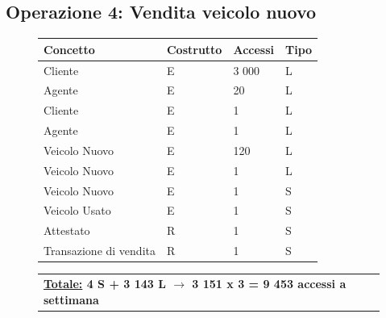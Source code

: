 \documentclass[a4paper,12pt]{report}
\begin{document}
\subsection*{Operazione 4: Vendita veicolo nuovo}
\begin{figure}[H]
	\centering
	\begin{tabular}{L{4.2cm}C{2cm}C{4.5cm}C{2cm}}
		\rule[-2mm]{0mm}{0.6cm}{}
		\textbf{Concetto} & \textbf{Costrutto} &\textbf{Accessi} & \textbf{Tipo} \\
		\hline\rule[-2mm]{0mm}{0.65cm}{}
		Cliente & E & 3 000 & L \\
		\hline\rule[-2mm]{0mm}{0.65cm}{}
		Agente & E & 20 & L \\
		\hline\rule[-2mm]{0mm}{0.65cm}{}
		Cliente & E & 1 & L \\
		\hline\rule[-2mm]{0mm}{0.65cm}{}
		Agente & E & 1 & L \\
		\hline\rule[-2mm]{0mm}{0.65cm}{}
		Veicolo Nuovo & E & 120 & L \\
		\hline\rule[-2mm]{0mm}{0.65cm}{}
		Veicolo Nuovo & E & 1 & L \\
		\hline\rule[-2mm]{0mm}{0.65cm}{}
		Veicolo Nuovo & E & 1 & S \\
		\hline\rule[-2mm]{0mm}{0.65cm}{}
		Veicolo Usato & E & 1 & S \\
		\hline\rule[-2mm]{0mm}{0.65cm}{}
		Attestato & R & 1 & S \\
		\hline\rule[-2mm]{0mm}{0.65cm}{}
		Transazione di vendita& R & 1 & S \\
	\end{tabular}
	
	\begin{tabular}{C{14cm}}
		\rule[-3mm]{0mm}{0.85cm}{}	
		 \textbf{\underline{Totale:} 4 S +  3 143 L $\to$ 3 151 x 3 = 9 453 accessi a settimana}
	\end{tabular}
\end{figure}
\end{document}
